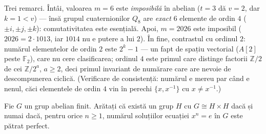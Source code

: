 \begin{obs}
Trei remarci. Întâi, valoarea $m=6$ este \emph{imposibilă} în
abelian ($t=3$ dă $v=2$, dar $k=1<v$) --- însă grupul
cuaternionilor $Q_{8}$ are \emph{exact} $6$ elemente de ordin $4$
($\pm i,\pm j,\pm k$): comutativitatea este esențială. Apoi,
$m=2026$ este imposibil ($2026=2\cdot 1013$, iar $1014$ nu e putere a lui
$2$). În fine, contrastul cu ordinul $2$: numărul elementelor de
ordin $2$ este $2^{k}-1$ --- un fapt de spațiu vectorial ($A[2]$ peste
$\mathbb{F}_{2}$), care nu cere clasificarea; ordinul $4$ este primul care
distinge factorii $\mathbb{Z}/2$ de cei $\mathbb{Z}/2^{a}$, $a\ge 2$, deci
primul invariant de numărare care are nevoie de descompunerea ciclică.
(Verificare de consistență: numărul e mereu par când e nenul,
căci elementele de ordin $4$ vin în perechi $\{x,x^{-1}\}$ cu
$x\neq x^{-1}$.)
\end{obs}

\begin{problema}
Fie $G$ un grup abelian finit. Arătați că există un grup $H$
cu $G\cong H\times H$ dacă și numai dacă, pentru orice $n\ge 1$,
numărul soluțiilor ecuației $x^{n}=e$ în $G$ este pătrat
perfect.
\end{problema}

